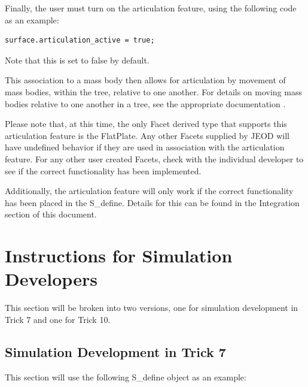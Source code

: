 Finally, the user must turn on the articulation feature, using the
following code as an example:

\begin{verbatim}
surface.articulation_active = true;
\end{verbatim}

Note that this is set to false by default.

This association to a mass body then allows for articulation by movement of
mass bodies, within the tree, relative to one another. For details on
moving mass bodies relative to one another in a tree, see the appropriate
documentation \cite{dynenv:MASS}.

Please note that, at this time, the only Facet derived type that supports this articulation
feature is the FlatPlate. Any other Facets supplied by JEOD will have undefined behavior
if they are used in association with the articulation feature. For any other user created
Facets, check with the individual developer to see if the correct functionality has been implemented.

Additionally, the articulation feature will only work if the correct functionality has been
placed in the S\_define. Details for this can be found in the Integration section of this document.

\section{Instructions for Simulation Developers}

This section will be broken into two versions, one for simulation development in Trick 7 and
one for Trick 10.

\subsection{Simulation Development in Trick 7}

This section will use the following S\_define object as an example:

